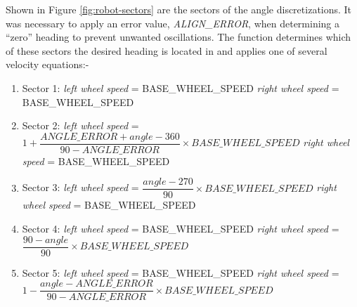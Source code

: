 Shown in Figure \ref{fig:robot-sectors} are the sectors of the angle discretizations. It was necessary to apply an error value, \textit{ALIGN\_ERROR}, when determining a ``zero'' heading to prevent unwanted oscillations. The function determines which of these sectors the desired heading is located in and applies one of several velocity equations:-

\begin{enumerate}
	\item Sector 1: \newline \textit{left wheel speed} = BASE\_WHEEL\_SPEED \newline
	\textit{right wheel speed} = BASE\_WHEEL\_SPEED

	\item Sector 2: \newline \textit{left wheel speed} = \(1 + \dfrac{ANGLE\_ERROR + angle - 360}{90 - ANGLE\_ERROR} \times BASE\_WHEEL\_SPEED\) \newline
	\textit{right wheel speed} = BASE\_WHEEL\_SPEED

	\item Sector 3: \newline\textit{left wheel speed} = \(\dfrac{angle - 270}{90} \times BASE\_WHEEL\_SPEED\) \newline
	\textit{right wheel speed} = BASE\_WHEEL\_SPEED

	\item Sector 4: \newline\textit{left wheel speed} = BASE\_WHEEL\_SPEED  \newline
	\textit{right wheel speed} = \(\dfrac{90 - angle}{90} \times BASE\_WHEEL\_SPEED\)

	\item Sector 5: \newline\textit{left wheel speed} = BASE\_WHEEL\_SPEED  \newline\newline
	\textit{right wheel speed} = \(1 - \dfrac{angle - ANGLE\_ERROR}{90 - ANGLE\_ERROR} \times BASE\_WHEEL\_SPEED\)

\end{enumerate}

